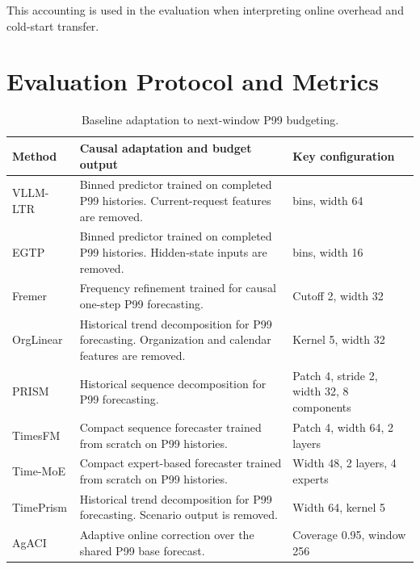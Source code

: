 \documentclass[sigplan,10pt, anonymous]{acmart}
\begin{document}
This accounting is used in the evaluation when interpreting online overhead and cold-start transfer.

\section{Evaluation Protocol and Metrics}
\label{app:addl-eval}

\begin{table}[t]
\centering
\caption{Baseline adaptation to next-window P99 budgeting.}
\label{tab:appendix-baseline-adaptation}
\scriptsize
\setlength{\tabcolsep}{5pt}
\renewcommand{\arraystretch}{0.72}
\begin{tabular}{
  >{\RaggedRight\arraybackslash}p{}
  >{\RaggedRight\arraybackslash}p{}
  >{\RaggedRight\arraybackslash}p{}}
\toprule
\textbf{Method} &
\textbf{Causal adaptation and budget output} &
\textbf{Key configuration} \\
\midrule
VLLM-LTR &
Binned predictor trained on completed P99 histories. Current-request features are removed. &
32 bins, width 64 \\

EGTP &
Binned predictor trained on completed P99 histories. Hidden-state inputs are removed. &
32 bins, width 16 \\

Fremer &
Frequency refinement trained for causal one-step P99 forecasting. &
Cutoff 2, width 32 \\

OrgLinear &
Historical trend decomposition for P99 forecasting. Organization and calendar features are removed. &
Kernel 5, width 32 \\

PRISM &
Historical sequence decomposition for P99 forecasting. &
Patch 4, stride 2, width 32, 8 components \\

TimesFM &
Compact sequence forecaster trained from scratch on P99 histories. &
Patch 4, width 64, 2 layers \\

Time-MoE &
Compact expert-based forecaster trained from scratch on P99 histories. &
Width 48, 2 layers, 4 experts \\

TimePrism &
Historical trend decomposition for P99 forecasting. Scenario output is removed. &
Width 64, kernel 5 \\

AgACI &
Adaptive online correction over the shared P99 base forecast. &
Coverage 0.95, window 256\\


\end{tabular}
\end{table}
\end{document}
